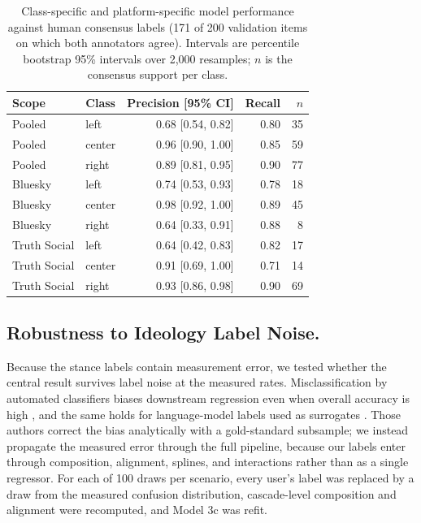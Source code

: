 \documentclass[letterpaper]{article} %
\newcommand{\rev}[1]{{\color{blue}#1}}
\begin{document}
\begin{table}[t]
\centering
\small
\rev{
\begin{tabular}{llrrr}
\toprule
Scope & Class & Precision [95\% CI] & Recall & $n$ \\
\midrule
Pooled & left & 0.68 [0.54, 0.82] & 0.80 & 35 \\
Pooled & center & 0.96 [0.90, 1.00] & 0.85 & 59 \\
Pooled & right & 0.89 [0.81, 0.95] & 0.90 & 77 \\
\midrule
Bluesky & left & 0.74 [0.53, 0.93] & 0.78 & 18 \\
Bluesky & center & 0.98 [0.92, 1.00] & 0.89 & 45 \\
Bluesky & right & 0.64 [0.33, 0.91] & 0.88 & 8 \\
\midrule
Truth Social & left & 0.64 [0.42, 0.83] & 0.82 & 17 \\
Truth Social & center & 0.91 [0.69, 1.00] & 0.71 & 14 \\
Truth Social & right & 0.93 [0.86, 0.98] & 0.90 & 69 \\
\bottomrule
\end{tabular}
}
\caption{\rev{Class-specific and platform-specific model performance against human consensus labels (171 of 200 validation items on which both annotators agree). Intervals are percentile bootstrap 95\% intervals over 2{,}000 resamples; $n$ is the consensus support per class.}}
\label{tab:validation}
\end{table}

\subsection*{\rev{Robustness to Ideology Label Noise.}}

\rev{Because the stance labels contain measurement error, we tested whether the central result survives label noise at the measured rates. Misclassification by automated classifiers biases downstream regression even when overall accuracy is high \citep{teblunthuis_misclassification_2024}, and the same holds for language-model labels used as surrogates \citep{egami_imperfect_2023}. Those authors correct the bias analytically with a gold-standard subsample; we instead propagate the measured error through the full pipeline, because our labels enter through composition, alignment, splines, and interactions rather than as a single regressor. For each of 100 draws per scenario, every user's label was replaced by a draw from the measured confusion distribution, cascade-level composition and alignment were recomputed, and Model 3c was refit.}
\end{document}
